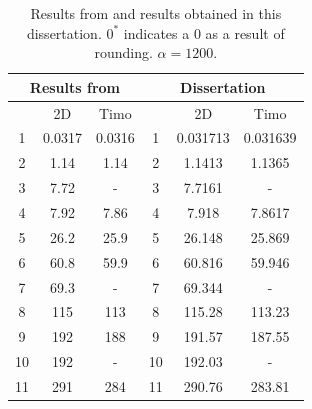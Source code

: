 	\begin{table}[!ht]
		\centering
		\caption{Results from \cite{LVV09} and results obtained in this dissertation. $0^*$ indicates a 0 as a result of rounding. $\alpha = 1200$.}
		\begin{tabular}{|c|c|c||c|c|c|}
			\hline
			\multicolumn{3}{|c||}{Results from \cite{LVV09}} & \multicolumn{3}{c|}{Dissertation} \\ \hline \hline
			~ & 2D & Timo & ~ & 2D & Timo  \\ \hline
			1 & 0.0317 & 0.0316 & 1 & 0.031713 & 0.031639  \\ 
			2 & 1.14 & 1.14  & 2 & 1.1413 & 1.1365  \\ 
			3 & 7.72 & - & 3 & 7.7161 & - \\ 
			4 & 7.92 & 7.86 &  4 & 7.918 & 7.8617    \\ 
			5 & 26.2 & 25.9 & 5 & 26.148 & 25.869   \\ 
			6 & 60.8 & 59.9 & 6 & 60.816 & 59.946  \\ 
			7 & 69.3 & - & 7 & 69.344 & -  \\ 
			8 & 115 & 113 &  8 & 115.28 & 113.23   \\ 
			9 & 192 & 188 &  9 & 191.57 & 187.55   \\ 
			10 & 192 & - & 10 & 192.03 & -  \\ 
			11 & 291 & 284 & 11 & 290.76 & 283.81   \\ \hline
		\end{tabular}\label{Results_LVV09}
	\end{table}


